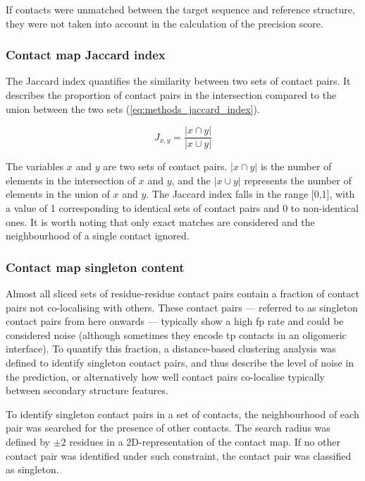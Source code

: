 If contacts were unmatched between the target sequence and reference structure, they were not taken into account in the calculation of the precision score.
\subsubsection{Contact map Jaccard index}
The Jaccard index quantifies the similarity between two sets of contact pairs. It describes the proportion of contact pairs in the intersection compared to the union between the two sets \cite{Wuyun2016-hh} (\cref{eq:methods_jaccard_index}).

\begin{equation}
J_{x,y}=\frac{\left |x \cap y\right |}{\left |x \cup y\right |}
\label{eq:methods_jaccard_index}
\end{equation}

The variables $x$ and $y$ are two sets of contact pairs. $\left |x \cap y\right |$ is the number of elements in the intersection of $x$ and $y$, and the $\left |x \cup y\right |$ represents the number of elements in the union of $x$ and $y$. The Jaccard index falls in the range [0,1], with a value of 1 corresponding to identical sets of contact pairs and 0 to non-identical ones. It is worth noting that only exact matches are considered and the neighbourhood of a single contact ignored.
\subsubsection{Contact map singleton content}
Almost all sliced sets of residue-residue contact pairs contain a fraction of contact pairs not co-localising with others. These contact pairs --- referred to as singleton contact pairs from here onwards --- typically show a high \gls{fp} rate and could be considered noise (although sometimes they encode \gls{tp} contacts in an oligomeric interface). To quantify this fraction, a distance-based clustering analysis was defined to identify singleton contact pairs, and thus describe the level of noise in the prediction, or alternatively how well contact pairs co-localise typically between secondary structure features.

To identify singleton contact pairs in a set of contacts, the neighbourhood of each pair was searched for the presence of other contacts. The search radius was defined by $\pm2$ residues in a 2D-representation of the contact map. If no other contact pair was identified under such constraint, the contact pair was classified as singleton.


